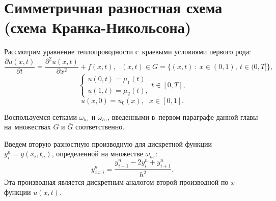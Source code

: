 \documentclass[11pt,a4paper,twoside]{report}
\numberwithin{equation}{section}
\theoremstyle{definition}
\theoremstyle{plain}
\begin{document}
\section{Симметричная разностная схема (схема Кранка-Никольсона)}
%
Рассмотрим уравнение теплопроводности с~краевыми условиями первого рода:
%
\begin{equation}
%
    \label{temp_equ_4}
    \frac{\partial u(x,t)}{\partial t} =
    \frac{\partial^2u(x,t)}{\partial x^2} + f(x,t),
    ~~~(x,t) \in G = \{(x, t)~:~x \in (0,1),~t\in (0,T]\},
%
\end{equation}
%
%
\begin{equation}
%
    \label{bord_4}
    \begin{cases}
        u(0,t) = \mu_1(t) \\
        u(1,t) = \mu_2(t),
    \end{cases}
    t\in [0,T],
%
\end{equation}
%
%
\begin{equation}
%
    \label{start_val_4}
    u(x,0) = u_0(x),~~~x\in[0,1].
%
\end{equation}

Воспользуемся сетками $\omega_{h \tau}$ и $\overline{\omega}_{h \tau}$,
введенными в~первом параграфе данной главы на~множествах $G$ и
$\overline{G}$ соответственно.

%
Введем вторую разностную производную для дискретной функции $y_i^n = y(x_i, t_n)$,
определенной на множестве $\overline{\omega}_{h \tau}$:
%
$$
    y_{\overline{x}x, i}^n = \frac{y_{i-1}^n - 2y_i^n + y_{i+1}^n}{h^2}.
$$
%
Эта производная является дискретным аналогом второй производной по $x$
функции $u(x,t)$.
\end{document}
